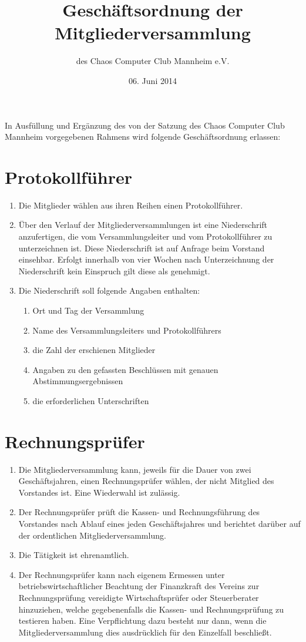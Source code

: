 \documentclass[a4paper, 12pt]{scrartcl}
\title{Geschäftsordnung der Mitgliederversammlung}
\subtitle{des Chaos Computer Club Mannheim e.V.}
\author{}
\date{06. Juni 2014}
\begin{document}
\maketitle

In Ausfüllung und Ergänzung des von der Satzung des Chaos Computer Club
Mannheim vorgegebenen Rahmens wird folgende Geschäftsordnung erlassen:

\section{Protokollführer}
\begin{enumerate}
	\item Die Mitglieder wählen aus ihren Reihen einen Protokollführer.
	\item Über den Verlauf der Mitgliederversammlungen ist eine Niederschrift anzufertigen, die vom Versammlungsleiter und vom Protokollführer zu unterzeichnen ist. Diese Niederschrift ist auf Anfrage beim Vorstand einsehbar. Erfolgt innerhalb von vier Wochen nach Unterzeichnung der Niederschrift kein Einspruch gilt diese als genehmigt.
	\item Die Niederschrift soll folgende Angaben enthalten:
		\begin{enumerate}
	  	\item Ort und Tag der Versammlung
	    \item Name des Versammlungsleiters und Protokollführers
	    \item die Zahl der erschienen Mitglieder
	    \item Angaben zu den gefassten Beschlüssen mit genauen Abstimmungsergebnissen
	    \item die erforderlichen Unterschriften
		\end{enumerate}
\end{enumerate}

\section{Rechnungsprüfer}
\begin{enumerate}
	\item Die Mitgliederversammlung kann, jeweils für die Dauer von zwei
Geschäftsjahren, einen Rechnungsprüfer wählen, der nicht Mitglied des
Vorstandes ist. Eine Wiederwahl ist zulässig.
	\item Der Rechnungsprüfer prüft die Kassen- und Rechnungsführung des
Vorstandes nach Ablauf eines jeden Geschäftsjahres und berichtet darüber
auf der ordentlichen Mitgliederversammlung.
	\item Die Tätigkeit ist ehrenamtlich.
	\item Der Rechnungsprüfer kann nach eigenem Ermessen unter
betriebswirtschaftlicher Beachtung der Finanzkraft des Vereins zur
Rechnungsprüfung vereidigte Wirtschaftsprüfer oder Steuerberater
hinzuziehen, welche gegebenenfalls die Kassen- und Rechnungsprüfung zu
testieren haben. Eine Verpflichtung dazu besteht nur dann, wenn die
Mitgliederversammlung dies ausdrücklich für den Einzelfall beschließt.
\end{enumerate}
\end{document}
